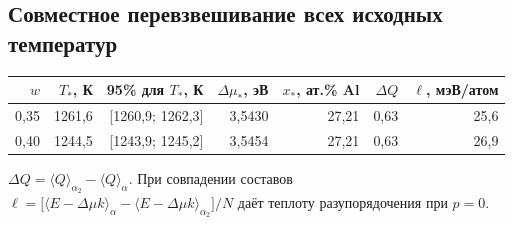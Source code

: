 \documentclass[11pt,a4paper]{article}
\begin{document}
\subsection*{Совместное перевзвешивание всех исходных температур}
\begin{center}\small\setlength{\tabcolsep}{3.6pt}\begin{tabular}{@{}rrrrrrr@{}}\toprule
\(w\) & \(T_*\), К & 95\% для \(T_*\), К & \(\Delta\mu_*\), эВ & \(x_*\), ат.\% Al & \(\Delta Q\) & \(\ell\), мэВ/атом\\\midrule
0,35 & 1261,6 & [1260,9; 1262,3] & 3,5430 & 27,21 & 0,63 & 25,6\\
0,40 & 1244,5 & [1243,9; 1245,2] & 3,5454 & 27,21 & 0,63 & 26,9\\
\bottomrule\end{tabular}\end{center}
{\small \(\Delta Q=\langle Q\rangle_{\alpha_2}-\langle Q\rangle_\alpha\). При совпадении составов \(\ell=\big[\langle E-\Delta\mu k\rangle_\alpha-\langle E-\Delta\mu k\rangle_{\alpha_2}\big]/N\) даёт теплоту разупорядочения при \(p=0\).}\par
\end{document}
